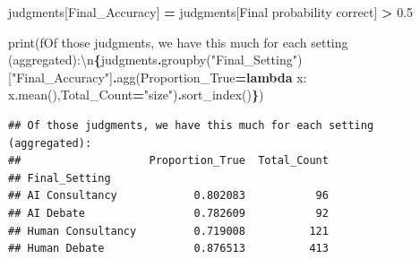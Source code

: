 \documentclass[
]{article}
\newenvironment{Shaded}{\begin{snugshade}}{\end{snugshade}}
\newcommand{\BuiltInTok}[1]{#1}
\newcommand{\CharTok}[1]{\textcolor[rgb]{0.31,0.60,0.02}{#1}}
\newcommand{\FloatTok}[1]{\textcolor[rgb]{0.00,0.00,0.81}{#1}}
\newcommand{\KeywordTok}[1]{\textcolor[rgb]{0.13,0.29,0.53}{\textbf{#1}}}
\newcommand{\NormalTok}[1]{#1}
\newcommand{\OperatorTok}[1]{\textcolor[rgb]{0.81,0.36,0.00}{\textbf{#1}}}
\newcommand{\SpecialCharTok}[1]{\textcolor[rgb]{0.81,0.36,0.00}{\textbf{#1}}}
\newcommand{\SpecialStringTok}[1]{\textcolor[rgb]{0.31,0.60,0.02}{#1}}
\newcommand{\StringTok}[1]{\textcolor[rgb]{0.31,0.60,0.02}{#1}}
\begin{document}
\begin{Shaded}
\begin{Highlighting}[]
\NormalTok{judgments[}\StringTok{\textquotesingle{}Final\_Accuracy\textquotesingle{}}\NormalTok{] }\OperatorTok{=}\NormalTok{ judgments[}\StringTok{\textquotesingle{}Final probability correct\textquotesingle{}}\NormalTok{] }\OperatorTok{\textgreater{}} \FloatTok{0.5}

\BuiltInTok{print}\NormalTok{(}\SpecialStringTok{f\textquotesingle{}Of those judgments, we have this much for each setting (aggregated):}\CharTok{\textbackslash{}n}\SpecialCharTok{\{}\NormalTok{judgments}\SpecialCharTok{.}\NormalTok{groupby(}\StringTok{"Final\_Setting"}\NormalTok{)[}\StringTok{"Final\_Accuracy"}\NormalTok{]}\SpecialCharTok{.}\NormalTok{agg(Proportion\_True}\OperatorTok{=}\KeywordTok{lambda}\NormalTok{ x: x.mean(),Total\_Count}\OperatorTok{=}\StringTok{"size"}\NormalTok{)}\SpecialCharTok{.}\NormalTok{sort\_index()}\SpecialCharTok{\}}\SpecialStringTok{\textquotesingle{}}\NormalTok{)}
\end{Highlighting}
\end{Shaded}

\begin{verbatim}
## Of those judgments, we have this much for each setting (aggregated):
##                    Proportion_True  Total_Count
## Final_Setting                                  
## AI Consultancy            0.802083           96
## AI Debate                 0.782609           92
## Human Consultancy         0.719008          121
## Human Debate              0.876513          413
\end{verbatim}
\end{document}
